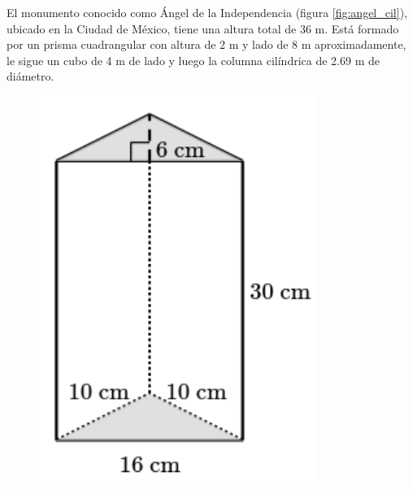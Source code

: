 \question[10] El monumento conocido como Ángel de la Independencia (figura \ref{fig:angel_cil}), ubicado en
la Ciudad de México, tiene una altura total de 36 m. Está formado por un prisma
cuadrangular con altura de 2 m y lado de 8 m aproximadamente, le sigue un cubo de 4 m de lado y luego la columna cilíndrica de 2.69 m de diámetro.


\begin{minipage}{0.3\linewidth}
    \begin{figure}[H]
        \begin{center}
            \includegraphics[width=0.8\textwidth]{../images/prob_verb_superficie_01}
        \end{center}
        \caption{}
        \label{fig:prob_verb_superficie_01}
    \end{figure}
\end{minipage}
